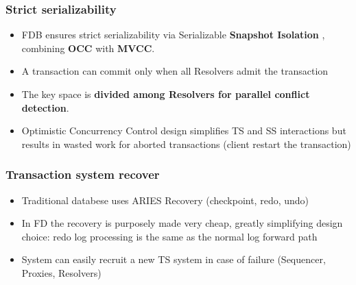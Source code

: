 

\begin{frame}
	\frametitle{Strict serializability}
\begin{itemize}
  \item FDB ensures strict serializability via Serializable \textbf{Snapshot Isolation} , combining \textbf{OCC} with \textbf{MVCC}.
  \item A transaction can commit only when all Resolvers admit the transaction
  \item The key space is \textbf{divided among Resolvers for parallel conflict detection}.
  \item Optimistic Concurrency Control design simplifies TS and SS interactions but results in wasted work for aborted transactions (client restart the transaction)
\end{itemize}

 \end{frame}







\begin{frame}
	\frametitle{Transaction system recover}
    \begin{itemize}
    
        \item Traditional databese uses ARIES Recovery (checkpoint, redo, undo)
        \item In FD the recovery is purposely made very cheap, greatly simplifying design choice: redo log processing is the same as the normal log forward path
        \item System can easily recruit a new TS system in case of failure (Sequencer, Proxies, Resolvers)
        
\end{itemize}
\end{frame}

